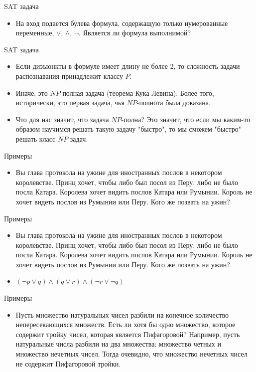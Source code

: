 \documentclass{beamer}
\begin{document}
\begin{frame}{SAT задача}
\begin{itemize}
\item На вход подается булева формула, содержащую только нумерованные переменные, $\vee$, $\wedge$, $\lnot$. Является ли формула выполнимой?
\end{itemize}
\end{frame}

\begin{frame}{SAT задача}
\begin{itemize}
\item Если дизъюнкты в формуле имеет длину не более 2, то сложность задачи распознавания принадлежит классу $P$.
\item Иначе, это $NP$-полная задача (теорема Кука-Левина). Более того, исторически, это первая задача, чья $NP$-полнота была доказана.
\item Что для нас значит, что задача $NP$-полна? Это значит, что если мы каким-то образом научимся решать такую задачу "быстро", то
мы сможем "быстро" решать класс $NP$ задач.
\end{itemize}
\end{frame}

\begin{frame}{Примеры}
\begin{itemize}
\item Вы глава протокола на ужине для иностранных послов в некотором королевстве. Принц хочет, чтобы либо был посол из Перу,
либо не было посла Катара. Королева хочет видить послов Катара или Румынии. Король не хочет видеть послов из Румынии или Перу.
Кого же позвать на ужин?
\end{itemize}
\end{frame}

\begin{frame}{Примеры}
\begin{itemize}
\item Вы глава протокола на ужине для иностранных послов в некотором королевстве. Принц хочет, чтобы либо был посол из Перу,
либо не было посла Катара. Королева хочет видить послов Катара или Румынии. Король не хочет видеть послов из Румынии или Перу.
Кого же позвать на ужин?
\item $(\lnot p \vee q) \wedge (q \vee r) \wedge (\lnot r \vee \lnot q)$
\end{itemize}
\end{frame}

\begin{frame}{Примеры}
\begin{itemize}
\item Пусть множество натуральных чисел разбили на конечное количество непересекающихся множеств. Есть ли хотя бы одно
множество, которое содержит тройку чисел, которая является Пифагоровой? Например, пусть натуральные числа разбили на два
множества: множество четных и множество нечетных чисел. Тогда очевидно, что множество нечетных чисел не содержит Пифагоровой
тройки.
\end{itemize}
\end{frame}
\end{document}
